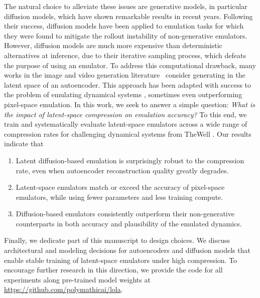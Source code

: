 The natural choice to alleviate these issues are generative models, in particular diffusion models, which have shown remarkable results in recent years. Following their success, diffusion models have been applied to emulation tasks \cite{lippe2023pderefiner, cachay2023dyffusion, shysheya2024conditional, kohl2024benchmarking, huang2024diffusionpde, price2025probabilistic} for which they were found to mitigate the rollout instability of non-generative emulators. However, diffusion models are much more expensive than deterministic alternatives at inference, due to their iterative sampling process, which defeats the purpose of using an emulator. To address this computational drawback, many works in the image and video generation literature~\cite{rombach2022highresolution, peebles2023scalable, esser2024scaling, karras2024analyzing, xie2025sana, chen2025deep, polyak2024movie} consider generating in the latent space of an autoencoder. This approach has been adapted with success to the problem of emulating dynamical systems \cite{gao2023prediff, du2024conditional, zhou2025text2pde, li2025generative, andry2025appa}, sometimes even outperforming pixel-space emulation. In this work, we seek to answer a simple question: \emph{What is the impact of latent-space compression on emulation accuracy?} To this end, we train and systematically evaluate latent-space emulators across a wide range of compression rates for challenging dynamical systems from TheWell \cite{ohana2024well}. Our results indicate that
\begin{enumerate}[label=\roman*., leftmargin=*]
    \item Latent diffusion-based emulation is surprisingly robust to the compression rate, even when autoencoder reconstruction quality greatly degrades.
    \item Latent-space emulators match or exceed the accuracy of pixel-space emulators, while using fewer parameters and less training compute.
    \item Diffusion-based emulators consistently outperform their non-generative counterparts in both accuracy and plausibility of the emulated dynamics.
\end{enumerate}

Finally, we dedicate part of this manuscript to design choices. We discuss architectural and modeling decisions for autoencoders and diffusion models that enable stable training of latent-space emulators under high compression. To encourage further research in this direction, we provide the code for all experiments along pre-trained model weights at \url{https://github.com/polymathicai/lola}.

